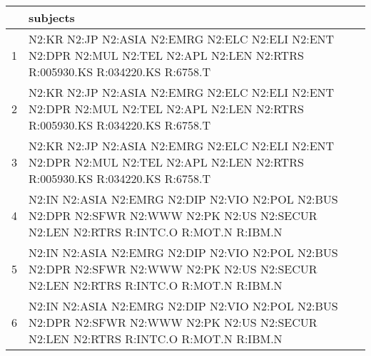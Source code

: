 \begin{table}[ht]
\centering
\begin{tabular}{rl}
  \hline
 & subjects \\ 
  \hline
1 & N2:KR N2:JP N2:ASIA N2:EMRG N2:ELC N2:ELI N2:ENT N2:DPR N2:MUL N2:TEL N2:APL N2:LEN N2:RTRS R:005930.KS R:034220.KS R:6758.T \\ 
  2 & N2:KR N2:JP N2:ASIA N2:EMRG N2:ELC N2:ELI N2:ENT N2:DPR N2:MUL N2:TEL N2:APL N2:LEN N2:RTRS R:005930.KS R:034220.KS R:6758.T \\ 
  3 & N2:KR N2:JP N2:ASIA N2:EMRG N2:ELC N2:ELI N2:ENT N2:DPR N2:MUL N2:TEL N2:APL N2:LEN N2:RTRS R:005930.KS R:034220.KS R:6758.T \\ 
  4 & N2:IN N2:ASIA N2:EMRG N2:DIP N2:VIO N2:POL N2:BUS N2:DPR N2:SFWR N2:WWW N2:PK N2:US N2:SECUR N2:LEN N2:RTRS R:INTC.O R:MOT.N R:IBM.N \\ 
  5 & N2:IN N2:ASIA N2:EMRG N2:DIP N2:VIO N2:POL N2:BUS N2:DPR N2:SFWR N2:WWW N2:PK N2:US N2:SECUR N2:LEN N2:RTRS R:INTC.O R:MOT.N R:IBM.N \\ 
  6 & N2:IN N2:ASIA N2:EMRG N2:DIP N2:VIO N2:POL N2:BUS N2:DPR N2:SFWR N2:WWW N2:PK N2:US N2:SECUR N2:LEN N2:RTRS R:INTC.O R:MOT.N R:IBM.N \\ 
   \hline
\end{tabular}
\end{table}
